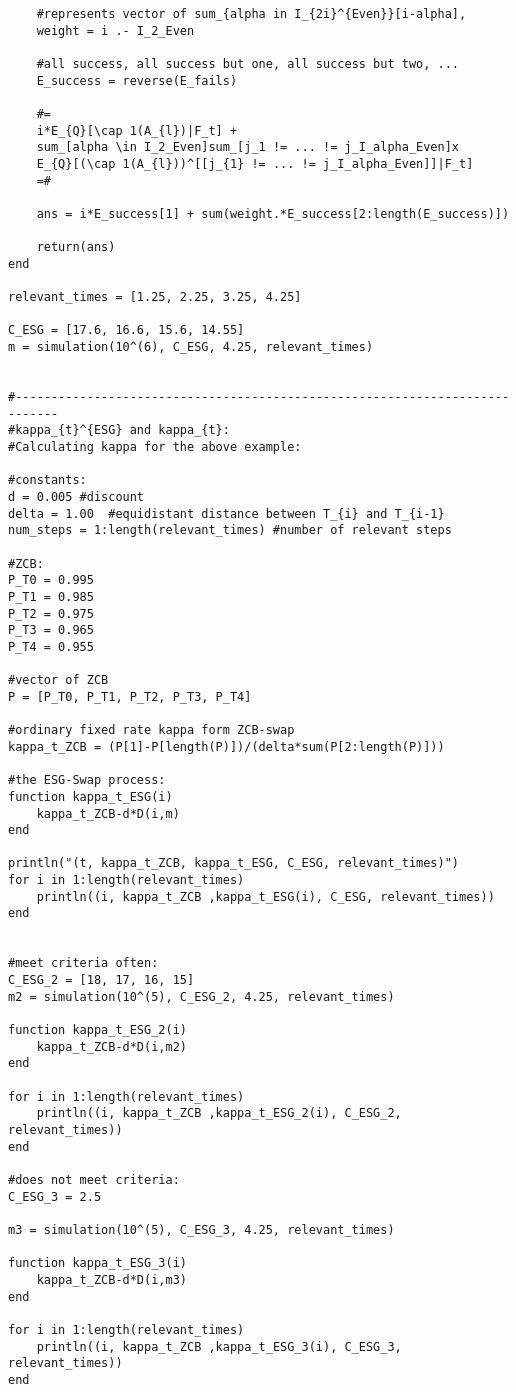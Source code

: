 \begin{verbatim}
    #represents vector of sum_{alpha in I_{2i}^{Even}}[i-alpha], 
    weight = i .- I_2_Even

    #all success, all success but one, all success but two, ... 
    E_success = reverse(E_fails)
    
    #=
    i*E_{Q}[\cap 1(A_{l})|F_t] + 
    sum_[alpha \in I_2_Even]sum_[j_1 != ... != j_I_alpha_Even]x
    E_{Q}[(\cap 1(A_{l}))^[[j_{1} != ... != j_I_alpha_Even]]|F_t] 
    =#

    ans = i*E_success[1] + sum(weight.*E_success[2:length(E_success)])

    return(ans)
end

relevant_times = [1.25, 2.25, 3.25, 4.25]

C_ESG = [17.6, 16.6, 15.6, 14.55]
m = simulation(10^(6), C_ESG, 4.25, relevant_times)


#----------------------------------------------------------------------------
#kappa_{t}^{ESG} and kappa_{t}: 
#Calculating kappa for the above example:

#constants:
d = 0.005 #discount
delta = 1.00  #equidistant distance between T_{i} and T_{i-1}
num_steps = 1:length(relevant_times) #number of relevant steps

#ZCB:
P_T0 = 0.995
P_T1 = 0.985
P_T2 = 0.975
P_T3 = 0.965
P_T4 = 0.955

#vector of ZCB
P = [P_T0, P_T1, P_T2, P_T3, P_T4] 

#ordinary fixed rate kappa form ZCB-swap
kappa_t_ZCB = (P[1]-P[length(P)])/(delta*sum(P[2:length(P)]))

#the ESG-Swap process:
function kappa_t_ESG(i)
    kappa_t_ZCB-d*D(i,m)
end

println("(t, kappa_t_ZCB, kappa_t_ESG, C_ESG, relevant_times)")
for i in 1:length(relevant_times)
    println((i, kappa_t_ZCB ,kappa_t_ESG(i), C_ESG, relevant_times))
end


#meet criteria often:  
C_ESG_2 = [18, 17, 16, 15]
m2 = simulation(10^(5), C_ESG_2, 4.25, relevant_times)

function kappa_t_ESG_2(i)
    kappa_t_ZCB-d*D(i,m2)
end

for i in 1:length(relevant_times)
    println((i, kappa_t_ZCB ,kappa_t_ESG_2(i), C_ESG_2, relevant_times))
end

#does not meet criteria: 
C_ESG_3 = 2.5

m3 = simulation(10^(5), C_ESG_3, 4.25, relevant_times)

function kappa_t_ESG_3(i)
    kappa_t_ZCB-d*D(i,m3)
end

for i in 1:length(relevant_times)
    println((i, kappa_t_ZCB ,kappa_t_ESG_3(i), C_ESG_3, relevant_times))
end


\end{verbatim}



